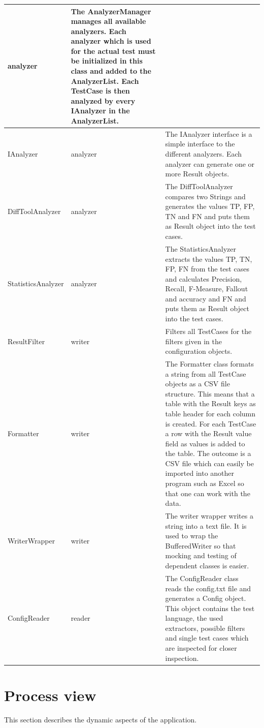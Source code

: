 \begin{longtable}{p{4cm}|p{2cm}|p{8cm}}
analyzer &          
The AnalyzerManager manages all available analyzers. Each analyzer which is used for the actual test must be initialized in this class and added to the AnalyzerList. Each TestCase is then analyzed by every IAnalyzer in the AnalyzerList.
\\ \hline
IAnalyzer &
analyzer &
The IAnalyzer interface is a simple interface to the different analyzers. Each analyzer can generate one or more Result objects.
\\ \hline
DiffToolAnalyzer &
analyzer &
The DiffToolAnalyzer compares two Strings and generates the values TP, FP, TN and FN and puts them as Result object into the test cases.
\\ \hline
StatisticsAnalyzer &
analyzer &
The StatisticsAnalyzer extracts the values TP, TN, FP, FN from the test cases and calculates Precision, Recall, F-Measure, Fallout and accuracy and FN and puts them as Result object into the test cases.
\\ \hline
ResultFilter &
writer &
Filters all TestCases for the filters given in the configuration objects.
\\ \hline
Formatter &           
writer &           
The Formatter class formats a string from all TestCase objects as a CSV file structure. This means that a table with the Result keys as table header for each column is created. For each TestCase a row with the Result value field as values is added to the table. The outcome is a CSV file which can easily be imported into another program such as Excel so that one can work with the data.
\\ \hline
WriterWrapper &
writer &
The writer wrapper writes a string into a text file. It is used to wrap the BufferedWriter so that mocking and testing of dependent classes is easier.
\\ \hline
ConfigReader &
reader &
The ConfigReader class reads the config.txt file and generates a Config object. This object contains the test language, the used extractors, possible filters and single test cases which are inspected for closer inspection.
\\ \hline
\end{longtable}


\section{Process view}

This section describes the dynamic aspects of the application.

